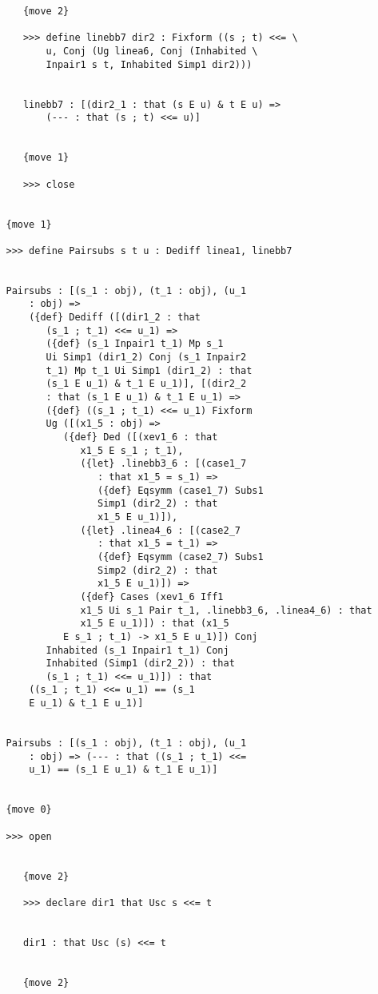 \documentclass[12pt]{article}
\begin{document}
\begin{verbatim}
      {move 2}

      >>> define linebb7 dir2 : Fixform ((s ; t) <<= \
          u, Conj (Ug linea6, Conj (Inhabited \
          Inpair1 s t, Inhabited Simp1 dir2)))


      linebb7 : [(dir2_1 : that (s E u) & t E u) => 
          (--- : that (s ; t) <<= u)]


      {move 1}

      >>> close


   {move 1}

   >>> define Pairsubs s t u : Dediff linea1, linebb7


   Pairsubs : [(s_1 : obj), (t_1 : obj), (u_1 
       : obj) => 
       ({def} Dediff ([(dir1_2 : that 
          (s_1 ; t_1) <<= u_1) => 
          ({def} (s_1 Inpair1 t_1) Mp s_1 
          Ui Simp1 (dir1_2) Conj (s_1 Inpair2 
          t_1) Mp t_1 Ui Simp1 (dir1_2) : that 
          (s_1 E u_1) & t_1 E u_1)], [(dir2_2 
          : that (s_1 E u_1) & t_1 E u_1) => 
          ({def} ((s_1 ; t_1) <<= u_1) Fixform 
          Ug ([(x1_5 : obj) => 
             ({def} Ded ([(xev1_6 : that 
                x1_5 E s_1 ; t_1), 
                ({let} .linebb3_6 : [(case1_7 
                   : that x1_5 = s_1) => 
                   ({def} Eqsymm (case1_7) Subs1 
                   Simp1 (dir2_2) : that 
                   x1_5 E u_1)]), 
                ({let} .linea4_6 : [(case2_7 
                   : that x1_5 = t_1) => 
                   ({def} Eqsymm (case2_7) Subs1 
                   Simp2 (dir2_2) : that 
                   x1_5 E u_1)]) => 
                ({def} Cases (xev1_6 Iff1 
                x1_5 Ui s_1 Pair t_1, .linebb3_6, .linea4_6) : that 
                x1_5 E u_1)]) : that (x1_5 
             E s_1 ; t_1) -> x1_5 E u_1)]) Conj 
          Inhabited (s_1 Inpair1 t_1) Conj 
          Inhabited (Simp1 (dir2_2)) : that 
          (s_1 ; t_1) <<= u_1)]) : that 
       ((s_1 ; t_1) <<= u_1) == (s_1 
       E u_1) & t_1 E u_1)]


   Pairsubs : [(s_1 : obj), (t_1 : obj), (u_1 
       : obj) => (--- : that ((s_1 ; t_1) <<= 
       u_1) == (s_1 E u_1) & t_1 E u_1)]


   {move 0}

   >>> open


      {move 2}

      >>> declare dir1 that Usc s <<= t


      dir1 : that Usc (s) <<= t


      {move 2}


\end{verbatim}
\end{document}
